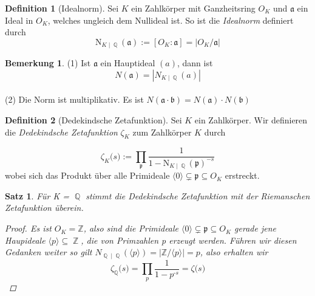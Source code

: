 \documentclass[10pt,a4paper]{article}
\theoremstyle{plain}
\newtheorem{satz}[thm]{Satz}
\theoremstyle{definition}
\newtheorem{defn}{Definition}[section]
\newtheorem*{note}{Bemerkung}
\theoremstyle{remark}
\DeclareMathOperator{\Q}{\mathbb{Q}}
\DeclareMathOperator{\Z}{\mathbb{Z}}
\begin{document}
\begin{defn}[Idealnorm]

Sei $\textit{K}$ ein Zahlkörper mit Ganzheitsring $O_{K}$ und $\mathfrak{a}$ ein Ideal in $O_{K}$, welches ungleich dem Nullideal ist. So ist die \textit{Idealnorm} definiert durch $$\mathrm{N}_{K \mid \Q}(\mathfrak{a}) := [O_{K} : \mathfrak{a} ] = \vert O_{K} / \mathfrak{a} \vert$$

\end{defn}

\begin{note}
(1) Ist $\mathfrak{a}$ ein Hauptideal $(a)$, dann ist $$N(\mathfrak{a}) = |N_{K\mid \Q}(a)|$$
\\
(2) Die Norm ist multiplikativ. Es ist $N(\mathfrak{a}\cdot \mathfrak{b}) = N(\mathfrak{a})\cdot N(\mathfrak{b})$

\end{note}

\begin{defn}[Dedekindsche Zetafunktion]

Sei $\textit{K}$ ein Zahlkörper. Wir definieren die \textit{Dedekindsche Zetafunktion} \textit{$\zeta_{\textit{K}}$} zum Zahlkörper $\textit{K}$ durch
	
$$\zeta_{\textit{K}} \textit{(s)}:= \prod_{\mathfrak{p}}\frac{1}{1-\mathrm{N}_{K \mid \Q}(\mathfrak{p})^{-s}}$$
wobei sich das Produkt über alle Primideale $\langle0\rangle\subsetneq \mathfrak{p} \subseteq O_{\textit{K}}$ erstreckt. 
\end{defn}

\begin{satz}

Für \textit{K} = $\Q$ stimmt die Dedekindsche Zetafunktion mit der Riemanschen Zetafunktion überein.

\begin{proof}
Es ist $O_\textit{K} = \mathbb{Z}$, also sind die Primideale $\langle0\rangle\subsetneq \mathfrak{p} \subseteq O_{\textit{K}}$ gerade jene Haupideale $\langle \textit{p}\rangle\subseteq\Z$, die von Primzahlen \textit{p} erzeugt werden. Führen wir diesen Gedanken weiter so gilt $N_{\Q\mid\Q}(\langle \textit{p}\rangle) = | \mathbb{Z}/\langle \textit{p}\rangle| = \textit{p}$, also erhalten wir  $$\zeta_{\Q} \textit{(s)}= \prod_{\textit{p}} \frac{1}{1-\textit{p}^\textit{-s}} = \zeta \textit{(s)} $$

\end{proof}

\end{satz}
\end{document}

